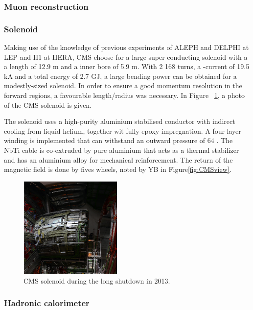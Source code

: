 \subsubsection*{Muon reconstruction}


\subsubsection{Solenoid}
	Making use of the knowledge of previous experiments of ALEPH and DELPHI at LEP and H1 at HERA, CMS choose for a large super conducting solenoid with a a length of 12.9 \si{ \meter} and a inner bore of 5.9 \si{ \meter}\cite{Bayatian:922757}. With 2 168 turns, a -current of 19.5 \si{ \kilo \ampere} and  a total energy of 2.7 \si{ \giga \joule}, a large bending power can be obtained for a modestly-sized solenoid. In order to ensure a good momentum resolution in the forward regions, a favourable length/radius was necessary.  In Figure  ~\ref{fig:CMSsolenoid}, a photo of the CMS solenoid is given. 

	The solenoid uses a high-purity aluminium stabilised conductor with indirect cooling from liquid helium, together wit fully epoxy impregnation. A four-layer winding is implemented that can withstand an outward pressure of 64 \si{ \atm}. The NbTi cable is co-extruded by pure aluminium that acts as a thermal stabilizer and has an aluminium alloy for mechanical reinforcement. The return of the magnetic field is done by fives wheels, noted by YB in Figure\ref{fig:CMSview}.
	
	\begin{figure}[ht]
		\centering
		\includegraphics[width=0.45\textwidth]{2_ExperimentalSetup/Figures/solenoid}
		\caption{CMS solenoid during the long shutdown in 2013. }
		\label{fig:CMSsolenoid}
	\end{figure}	
	
\subsubsection{Hadronic calorimeter}

